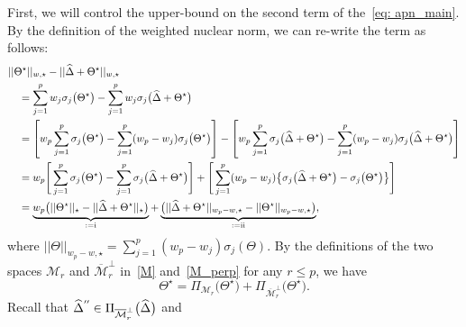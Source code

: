 \documentclass[12pt]{article}
\newcommand*{\mydprime}{^{\prime\prime}\mkern-1.2mu}
\newcommand{\RN}[1]{%
  \textup{\uppercase\expandafter{\romannumeral#1}}%
}
\begin{document}
First, we will control the upper-bound on the second term of the~\eqref{eq: apn_main}.
By the definition of the weighted nuclear norm, we can re-write the term as follows:
\begin{align}
    & ||\Theta^{\star}||_{w,\star} - ||\widehat{\Delta} + \Theta^{\star}||_{w,\star} \nonumber \\
    & \quad = \sum^{p}_{j = 1} w_{j}\sigma_{j}\big(\Theta^{\star}\big) - \sum^{p}_{j = 1} w_{j}\sigma_{j}\big(\widehat{\Delta} + \Theta^{\star}\big)  \nonumber \\
    & \quad = \left[w_{p}\sum^{p}_{j = 1}\sigma_{j}\big(\Theta^{\star}\big) - \sum^{p}_{j = 1}(w_{p} - w_{j})\sigma_{j}\big(\Theta^{\star}\big)\right] - \left[w_{p}\sum^{p}_{j = 1}\sigma_{j}\big(\widehat{\Delta} + \Theta^{\star}\big) - \sum^{p}_{j = 1}(w_{p} - w_{j})\sigma_{j}\big(\widehat{\Delta} + \Theta^{\star}\big)\right] \nonumber \\
    & \quad = w_{p}\Bigg[ \sum^{p}_{j = 1}\sigma_{j}\big(\Theta^{\star}\big) - \sum^{p}_{j = 1}\sigma_{j}\big(\widehat{\Delta} + \Theta^{\star}\big) \Bigg] + \Bigg[ \sum^{p}_{j=1}(w_{p} - w_{j})\big\{ \sigma_{j}\big(\widehat{\Delta} + \Theta^{\star}\big)-\sigma_{j}\big(\Theta^{\star}\big)\big\}\Bigg] \nonumber\\
    & \quad = \underbrace{w_{p}\big( ||\Theta^{\star}||_{\star} - ||\widehat{\Delta} + \Theta^{\star}||_{\star} \big)}_{:=\RN{1}} + \underbrace{\big( ||\widehat{\Delta} + \Theta^{\star}||_{w_{p}-w,\star} - ||\Theta^{\star}||_{w_{p}-w,\star}\big)}_{:=\RN{2}}, \label{eq: wnn_diff}
\end{align}
where $||\Theta||_{w_{p} - w, \star} = \sum^{p}_{j = 1} (w_{p} - w_{j})\sigma_{j}(\Theta)$.
\newpage \noindent
By the definitions of the two spaces $\mathcal{M}_{r}$ and $\overline{\mathcal{M}}_{r}^{\perp}$ in~\eqref{M} and~\eqref{M_perp} for any $r\leq p$, we have
\begin{equation} \label{star}
    \Theta^{\star} = \Pi_{\mathcal{M}_{r}}\big(\Theta^{\star}\big) +  \Pi_{\overline{\mathcal{M}}_{r}^{\perp}}\big(\Theta^{\star}\big).
\end{equation}
Recall that $\widehat{\Delta}^{\mydprime} \in \Pi_{\overline{\mathcal{M}}_{r}^{\perp}}\big(\widehat{\Delta}\big)$ and 
\end{document}
